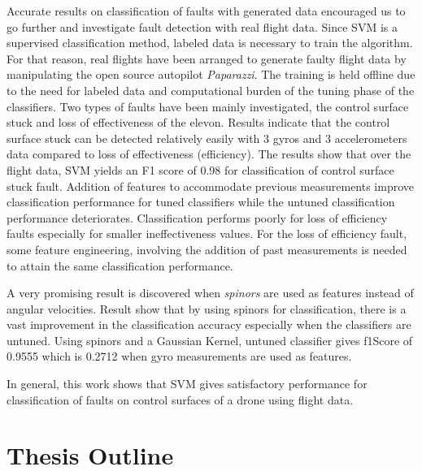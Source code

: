 Accurate results on classification of faults with generated data encouraged us to go further and investigate fault detection with real flight data. 
Since SVM is a supervised classification method, labeled data is necessary to train the algorithm. For that reason, real flights have been arranged to generate faulty flight data by manipulating the open source autopilot \emph{Paparazzi}.  
The training is held offline due to the need for labeled data and computational burden of the tuning phase of the classifiers. 
Two types of faults have been mainly investigated, the control surface stuck and loss of effectiveness of the elevon. Results indicate that the control surface stuck can be detected relatively easily with 3 gyros and 3 accelerometers data compared to loss of effectiveness (efficiency). 
The results show that over the flight data, SVM yields an F1 score of 0.98 for classification of control surface stuck fault. 
Addition of features to accommodate previous measurements improve classification performance for tuned classifiers while the untuned classification performance deteriorates. 
Classification performs poorly for loss of efficiency faults especially for smaller ineffectiveness values. 
For the loss of efficiency fault, some feature engineering, involving the addition of past measurements is needed to attain the same classification performance.

A very promising result is discovered when \emph{spinors} are used as features instead of angular velocities. 
Result show that by using spinors for classification, there is a vast improvement in the classification accuracy especially when the classifiers are untuned. Using spinors and a Gaussian Kernel, untuned classifier gives f1Score of 0.9555 which is 0.2712 when gyro measurements are used as features.

In general, this work shows that SVM gives satisfactory performance for classification of faults on control surfaces of a drone using flight data.

\section{Thesis Outline}

